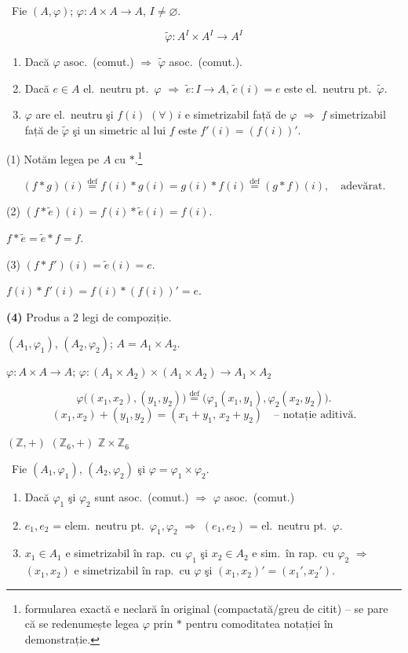 \documentclass[12pt]{article}
\begin{document}
\noindent{} \ Fie $(A,\varphi)$; $\varphi : A\times A \to A$, $I\neq\varnothing$.

\[
\tilde\varphi : A^I \times A^I \to A^I
\]

\begin{enumerate}
\item[(1)] Dacă $\varphi$ asoc.\ (comut.) $\Rightarrow$ $\tilde\varphi$ asoc.\ (comut.).
\item[(2)] Dacă $e\in A$ el.\ neutru pt.\ $\varphi$ $\Rightarrow$ $\tilde e : I\to A$, $\tilde e(i)=e$ este el.\ neutru pt.\ $\tilde\varphi$.
\item[(3)] $\varphi$ are el.\ neutru şi $f(i)$ $(\forall)\,i$ e simetrizabil față de $\varphi$ $\Rightarrow$ $f$ simetrizabil față de $\tilde\varphi$ şi un simetric al lui $f$ este $f'(i) = (f(i))'$.
\end{enumerate}

\bigskip
\noindent (1) Notăm legea pe $A$ cu $*$.\footnote{formularea exactă e neclară în original (compactată/greu de citit) -- se pare că se redenumește legea $\varphi$ prin $*$ pentru comoditatea notației în demonstrație.}

\[
(f*g)(i) \overset{\text{def}}{=} f(i)*g(i) = g(i)*f(i) \overset{\text{def}}{=} (g*f)(i), \quad \text{adevărat.}
\]

\noindent (2) $(f*\tilde e)(i) = f(i)*\tilde e(i) = f(i)$.

\noindent $f*\tilde e = \tilde e*f = f$.

\noindent (3) $(f*f')(i) = \tilde e(i) = e$.

\noindent $f(i)*f'(i) = f(i)*(f(i))' = e$.

\bigskip
\noindent\textbf{(4)} Produs a 2 legi de compoziție.

\noindent $(A_1,\varphi_1)$, $(A_2,\varphi_2)$; $A = A_1\times A_2$.

\noindent $\varphi : A\times A \to A$; \quad $\varphi : (A_1\times A_2)\times(A_1\times A_2) \to A_1\times A_2$

\[
\varphi\big((x_1,x_2),(y_1,y_2)\big) \overset{\text{def}}{=} \big(\varphi_1(x_1,y_1),\varphi_2(x_2,y_2)\big).
\]
\[
(x_1,x_2)+(y_1,y_2) = (x_1+y_1,\,x_2+y_2) \quad \text{-- notație aditivă.}
\]

\noindent $(\mathbb{Z},+)$ \qquad $(\mathbb{Z}_6,+)$ \qquad $\mathbb{Z}\times\mathbb{Z}_6$

\bigskip
\noindent{} \ Fie $(A_1,\varphi_1)$, $(A_2,\varphi_2)$ şi $\varphi = \varphi_1\times\varphi_2$.

\begin{enumerate}
\item[(1)] Dacă $\varphi_1$ şi $\varphi_2$ sunt asoc.\ (comut.) $\Rightarrow$ $\varphi$ asoc.\ (comut.)
\item[(2)] $e_1,e_2$ = elem.\ neutru pt.\ $\varphi_1,\varphi_2$ $\Rightarrow$ $(e_1,e_2)$ = el.\ neutru pt.\ $\varphi$.
\item[(3)] $x_1\in A_1$ e simetrizabil în rap.\ cu $\varphi_1$ şi $x_2\in A_2$ e sim.\ în rap.\ cu $\varphi_2$ $\Rightarrow$ $(x_1,x_2)$ e simetrizabil în rap.\ cu $\varphi$ şi $(x_1,x_2)' = (x_1',x_2')$.
\end{enumerate}
\end{document}
